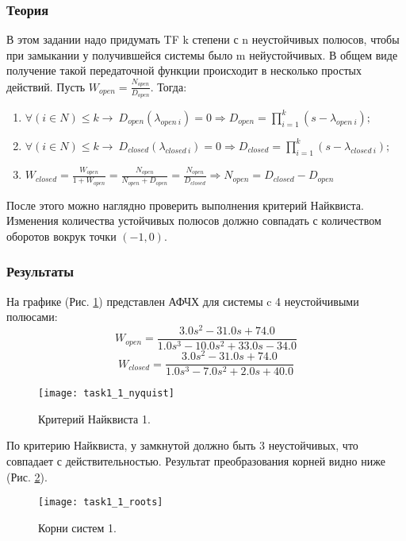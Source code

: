 \documentclass[16pt]{article}
\begin{document}
\subsubsection{Теория}
В этом задании надо придумать TF k степени с n неустойчивых полюсов, чтобы при замыкании у получившейся системы было m нейустойчивых. В общем виде получение такой передаточной функции происходит в несколько простых действий. Пусть \(W_{open} = \frac{N_{open}}{D_{open}}\). Тогда:
\begin{enumerate}
    \item \(\forall (i \in N) \leq k \rightarrow \ D_{open}(\lambda_{open \ i}) = 0 \Rightarrow D_{open} = \prod\limits_{i=1}^k(s - \lambda_{open \ i});\)
    \item \(\forall (i \in N) \leq k \rightarrow \ D_{closed}(\lambda_{closed \ i}) = 0 \Rightarrow D_{closed} = \prod\limits_{i=1}^k(s - \lambda_{closed \ i});\)
    \item \(W_{closed} = \frac{W_{open}}{1+W_{open}} = \frac{N_{open}}{N_{open} + D_{open}} = \frac{N_{open}}{D_{closed}} \Rightarrow N_{open} = D_{closed} - D_{open}\)
\end{enumerate} 
После этого можно наглядно проверить выполнения критерий Найквиста. Изменения количества устойчивых полюсов должно совпадать с количеством оборотов вокрук точки \((-1, 0)\).

\subsubsection{Результаты}

На графике (Рис. \ref*{fig:fig1}) представлен АФЧХ для системы c 4 неустойчивыми полюсами:
\[
    W_{open} = \frac{3.0 s^{2} - 31.0 s + 74.0}{1.0 s^{3} - 10.0 s^{2} + 33.0 s - 34.0}
    \]
\[
    W_{closed} =\frac{3.0 s^{2} - 31.0 s + 74.0}{1.0 s^{3} - 7.0 s^{2} + 2.0 s + 40.0}
    \]
\begin{figure}[h!]
    \centering
    \texttt{[image: task1\_1\_nyquist]}
    \caption{Критерий Найквиста 1.}
    \label{fig:fig1}
\end{figure}

По критерию Найквиста, у замкнутой должно быть 3 неустойчивых, что совпадает с действительностью. Результат преобразования корней видно ниже (Рис. \ref*{fig:fig2}).

\begin{figure}[h!]
    \centering
    \texttt{[image: task1\_1\_roots]}
    \caption{Корни систем 1.}
    \label{fig:fig2}
\end{figure}
\end{document}
